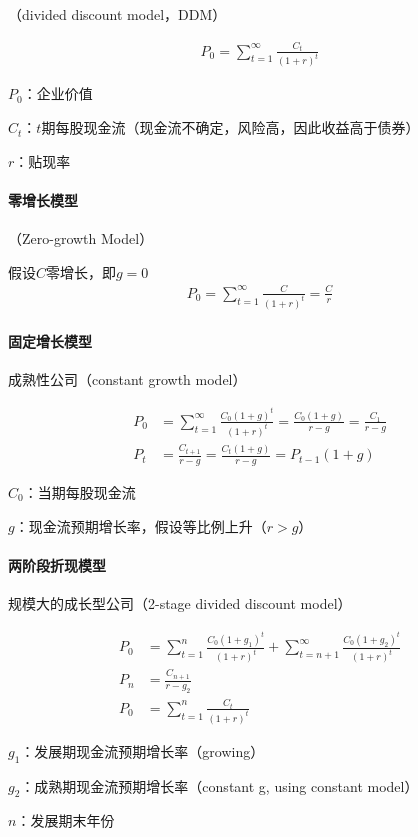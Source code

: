 \documentclass[12pt]{book}
\begin{document}
（divided discount model，DDM）

\begin{gather*}
  P_0 = \sum_{t=1}^{\infty}{\frac{C_t}{(1+r)^t}}
\end{gather*}
 
\par $P_0$：企业价值
\par $C_t$：$t$期每股现金流（现金流不确定，风险高，因此收益高于债券）
\par $r$：贴现率


\paragraph{零增长模型}

（Zero-growth Model）


假设$C$零增长，即$g=0$
\begin{gather*}
  P_0=\sum_{t=1}^{\infty}{\frac{C}{(1+r)^t}} 
     =\frac{C}{r}
\end{gather*}


\paragraph{固定增长模型}

成熟性公司（constant growth model）

\begin{align*}
  P_0& = \sum_{t=1}^{\infty}{\frac{C_0(1+g)^t}{(1+r)^t}}
      = \frac{C_{0}(1+g)}{r-g}
      =\frac{C_1}{r-g} \\
  P_t&=\frac{C_{t+1}}{r-g}
     =\frac{C_t\left(1+g\right)}{r-g}
     =P_{t-1}\left(1+g\right)
\end{align*}
\par $C_0$：当期每股现金流
\par $g$：现金流预期增长率，假设等比例上升（$r>g$）


\paragraph{两阶段折现模型}

规模大的成长型公司（2-stage divided discount model）


\begin{align*}
  P_0&=\sum_{t=1}^{n}{\frac{C_0 (1+g_1 )^t}{(1+r)^t}} +\sum_{t=n+1}^{\infty}{\frac{C_0 (1+g_2 )^t}{(1+r)^t}} \\
  P_n&=\frac{C_{n+1}}{r-g_2} \\
  P_0&=\sum_{t=1}^{n}{\frac{C_t}{(1+r)^t}}
\end{align*}
\par $g_1$：发展期现金流预期增长率（growing）
\par $g_2$：成熟期现金流预期增长率（constant g, using constant model）
\par $n$：发展期末年份
\end{document}
